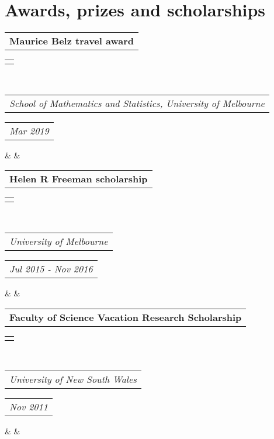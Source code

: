 \documentclass[11pt,a4paper,roman]{moderncv}        %
\makeatletter
\newcommand*{\customcventry}[7][.25em]{
  \begin{tabular}{@{}l} 
    {\bfseries #4}
  \end{tabular}
  \hfill%
  \begin{tabular}{l@{}}
     {\bfseries #5}
  \end{tabular} \\
  \begin{tabular}{@{}l} 
    {\itshape #3}
  \end{tabular}
  \hfill%
  \begin{tabular}{l@{}}
     {\itshape #2}
  \end{tabular}
  \ifx&#7&%
  \else{\\%
    \begin{minipage}{\maincolumnwidth}%
      \small#7%
    \end{minipage}}\fi%
  \par\addvspace{#1}}
\makeatother
\begin{document}
{\vspace{4mm} 

 \section{Awards, prizes and scholarships}
 
 {\customcventry{Mar 2019}{School of Mathematics and Statistics, University of Melbourne}{Maurice Belz travel award}{}{}{
 }}
 
 \vspace{3mm}

%

 

%

{\customcventry{Jul 2015 - Nov 2016}{University of Melbourne}{Helen R Freeman scholarship}{}{}{
%
}}

\vspace{3mm} 

{\customcventry{Nov 2011}{University of New South Wales}{Faculty of Science Vacation Research Scholarship}{}{}{
}}

}
\end{document}
